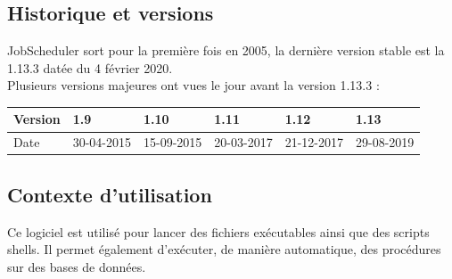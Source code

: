 \documentclass[12pt]{article}
\begin{document}

\subsection{Historique et versions}
JobScheduler sort pour la première fois en 2005, la dernière version stable est la 1.13.3 datée du 4 février 2020.
\\
Plusieurs versions majeures ont vues le jour avant la version 1.13.3 :

\begin{center}
\begin{tabular}{|l|l|l|l|l|l|}
\hline
Version & 1.9        & 1.10       & 1.11       & 1.12       & 1.13       \\ \hline
Date    & 30-04-2015 & 15-09-2015 & 20-03-2017 & 21-12-2017 & 29-08-2019 \\ \hline
\end{tabular}
\end{center}

\subsection{Contexte d'utilisation}
Ce logiciel est utilisé pour lancer des fichiers exécutables ainsi que des scripts shells. Il permet également d'exécuter, de manière automatique, des procédures sur des bases de données. 
\end{document}
